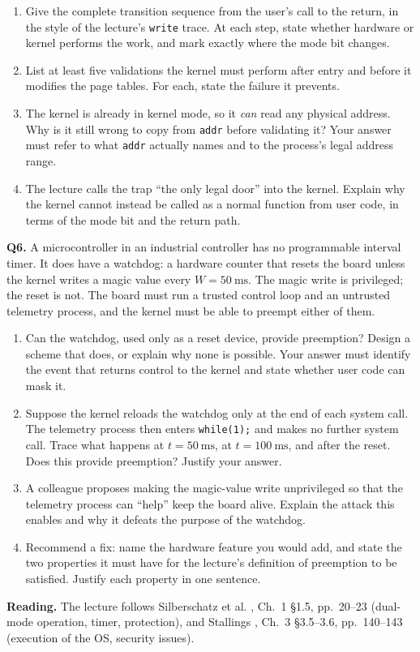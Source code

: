 \documentclass[11pt]{article}
\begin{document}
\begin{enumerate}
  \item[(a)] Give the complete transition sequence from the user's call to the return, in the style of the lecture's \texttt{write} trace. At each step, state whether hardware or kernel performs the work, and mark exactly where the mode bit changes.
  \item[(b)] List at least five validations the kernel must perform after entry and before it modifies the page tables. For each, state the failure it prevents.
  \item[(c)] The kernel is already in kernel mode, so it \emph{can} read any physical address. Why is it still wrong to copy from \texttt{addr} before validating it? Your answer must refer to what \texttt{addr} actually names and to the process's legal address range.
  \item[(d)] The lecture calls the trap ``the only legal door'' into the kernel. Explain why the kernel cannot instead be called as a normal function from user code, in terms of the mode bit and the return path.
\end{enumerate}

\textbf{Q6.} A microcontroller in an industrial controller has no programmable interval timer. It does have a watchdog: a hardware counter that resets the board unless the kernel writes a magic value every $W = 50\ \text{ms}$. The magic write is privileged; the reset is not. The board must run a trusted control loop and an untrusted telemetry process, and the kernel must be able to preempt either of them.

\begin{enumerate}
  \item[(a)] Can the watchdog, used only as a reset device, provide preemption? Design a scheme that does, or explain why none is possible. Your answer must identify the event that returns control to the kernel and state whether user code can mask it.
  \item[(b)] Suppose the kernel reloads the watchdog only at the end of each system call. The telemetry process then enters \texttt{while(1);} and makes no further system call. Trace what happens at $t = 50\ \text{ms}$, at $t = 100\ \text{ms}$, and after the reset. Does this provide preemption? Justify your answer.
  \item[(c)] A colleague proposes making the magic-value write unprivileged so that the telemetry process can ``help'' keep the board alive. Explain the attack this enables and why it defeats the purpose of the watchdog.
  \item[(d)] Recommend a fix: name the hardware feature you would add, and state the two properties it must have for the lecture's definition of preemption to be satisfied. Justify each property in one sentence.
\end{enumerate}

\noindent\textbf{Reading.} The lecture follows Silberschatz et al. \cite{SilberschatzOSC_operating_system_concepts}, Ch.~1 \S1.5, pp.~20--23 (dual-mode operation, timer, protection), and Stallings \cite{StallingsOS_internals_design_principles}, Ch.~3 \S3.5--3.6, pp.~140--143 (execution of the OS, security issues).



\end{document}
